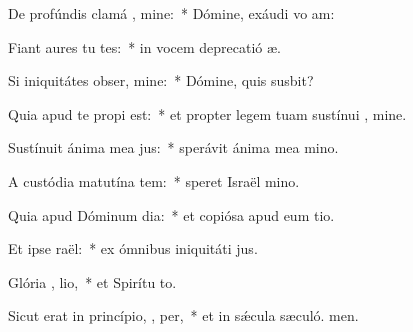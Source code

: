 \item De profúndis clamá  , mine:~* Dómine, exáudi vo am:
\item Fiant aures tu tes:~* in vocem deprecatió æ.
\item Si iniquitátes obser, mine:~* Dómine, quis susbit?
\item Quia apud te propi est:~* et propter legem tuam sustínui , mine.
\item Sustínuit ánima mea   jus:~* sperávit ánima mea  mino.
\item A custódia matutína   tem:~* speret Israël  mino.
\item Quia apud Dóminum dia:~* et copiósa apud eum tio.
\item Et ipse  raël:~* ex ómnibus iniquitáti jus.
\item Glória ,  lio,~* et Spirítu to.
\item Sicut erat in princípio,  ,  per,~* et in sǽcula sæculó. men.
